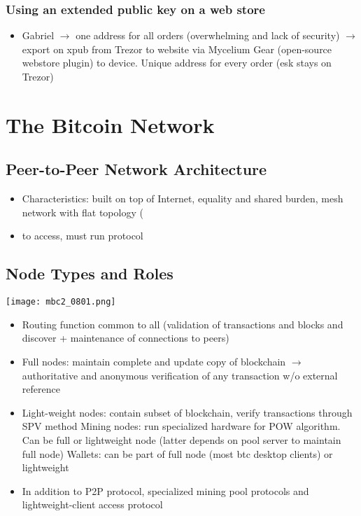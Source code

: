\documentclass[english, 11pt]{article}
\begin{document}
\subsubsection{Using an extended public key on a web store}
\begin{itemize}
    \item Gabriel $\rightarrow$ one address for all orders (overwhelming and lack of security) $\rightarrow$ export on xpub from Trezor to website via Mycelium Gear (open-source webstore plugin) to device. Unique address for every order (esk stays on Trezor)
\end{itemize}
\section{The Bitcoin Network}

\subsection{Peer-to-Peer Network Architecture}
\begin{itemize}
    \item Characteristics: built on top of Internet, equality and shared burden, mesh network with flat topology (
    \item to access, must run protocol
\end{itemize}


\subsection{Node Types and Roles}
\begin{minipage}{0.3\linewidth}
    \texttt{[image: mbc2\_0801.png]} 
\end{minipage}\hfil
\begin{minipage}{0.35\linewidth}
\begin{itemize}
    \item Routing function common to all (validation of transactions and blocks and discover + maintenance of connections to peers)
\end{itemize}
\end{minipage}
\begin{itemize}
    \item Full nodes: maintain complete and update copy of blockchain $\rightarrow$ authoritative and anonymous verification of any transaction w/o external reference
    \item Light-weight nodes: contain subset of blockchain, verify transactions through SPV method
    Mining nodes: run specialized hardware for POW algorithm. Can be full or lightweight node (latter depends on pool server to maintain full node)
    Wallets: can be part of full node (most btc desktop clients) or lightweight
    \item In addition to P2P protocol, specialized mining pool protocols and lightweight-client access protocol
\end{itemize}
\end{document}
